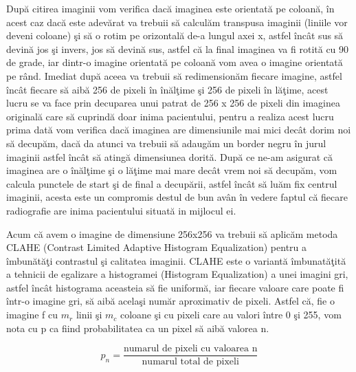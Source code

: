 Dup\u{a} citirea imaginii vom verifica dac\u{a} imaginea este orientat\u{a} pe coloan\u{a}, \^{i}n acest caz dac\u{a} este adev\u{a}rat  va trebuii s\u{a} calcul\u{a}m transpusa imaginii (liniile vor deveni coloane) \c{s}i s\u{a} o rotim pe orizontal\u{a} de-a lungul axei x, astfel \^{i}nc\^{a}t sus s\u{a} devin\u{a} jos \c{s}i invers, jos s\u{a} devin\u{a} sus, astfel c\u{a} la final imaginea va fi rotit\u{a} cu 90 de grade, iar dintr-o imagine orientat\u{a} pe coloan\u{a} vom avea o imagine orientat\u{a} pe r\^{a}nd. Imediat dup\u{a} aceea va trebuii s\u{a} redimension\u{a}m fiecare imagine, astfel \^{i}nc\^{a}t fiecare s\u{a} aib\u{a} 256 de pixeli \^{i}n \^{i}n\u{a}l\c{t}ime \c{s}i 256 de pixeli \^{i}n l\u{a}\c{t}ime, acest lucru se va face prin decuparea unui patrat de 256 x 256 de pixeli din imaginea original\u{a} care s\u{a} cuprind\u{a} doar inima pacientului, pentru a realiza acest lucru prima dat\u{a} vom verifica dac\u{a} imaginea are dimensiunile mai mici dec\^{a}t dorim noi s\u{a} decup\u{a}m, dac\u{a} da atunci va trebuii s\u{a} adaug\u{a}m un border negru \^{i}n jurul imaginii astfel \^{i}nc\^{a}t s\u{a} ating\u{a} dimensiunea dorit\u{a}. Dup\u{a} ce ne-am asigurat c\u{a} imaginea are o \^{i}n\u{a}l\c{t}ime \c{s}i o l\u{a}\c{t}ime mai mare dec\^{a}t vrem noi s\u{a} decup\u{a}m,  vom calcula punctele de start \c{s}i de final a decup\u{a}rii, astfel \^{i}nc\^{a}t s\u{a} lu\u{a}m fix centrul imaginii, acesta este un compromis destul de bun av\^{a}n \^{i}n vedere faptul c\u{a} fiecare radiografie are inima pacientului situat\u{a} in mijlocul ei.

\par

Acum c\u{a} avem o imagine de dimensiune 256x256 va trebuii s\u{a} aplic\u{a}m metoda CLAHE (Contrast Limited Adaptive Histogram Equalization) pentru a \^{i}mbun\u{a}t\u{a}\c{t}i contrastul \c{s}i calitatea imaginii. CLAHE este o variant\u{a} \^{i}mbunat\u{a}\c{t}it\u{a} a tehnicii de egalizare a histogramei (Histogram Equalization) a unei imagini gri, astfel \^{i}nc\^{a}t histograma aceasteia s\u{a} fie uniform\u{a}, iar fiecare valoare care poate fi \^{i}ntr-o imagine gri, s\u{a} aib\u{a} acela\c{s}i num\u{a}r aproximativ de pixeli. Astfel c\u{a}, fie o imagine f cu $m_r$ linii \c{s}i $m_c$ coloane \c{s}i cu pixeli care au valori \^{i}ntre 0 \c{s}i 255, vom nota cu p ca fiind probabilitatea ca un pixel s\u{a} aib\u{a} valorea n.

$$p_n = \frac{\text{numarul de pixeli cu valoarea n}}{\text{numarul total de pixeli}}$$


